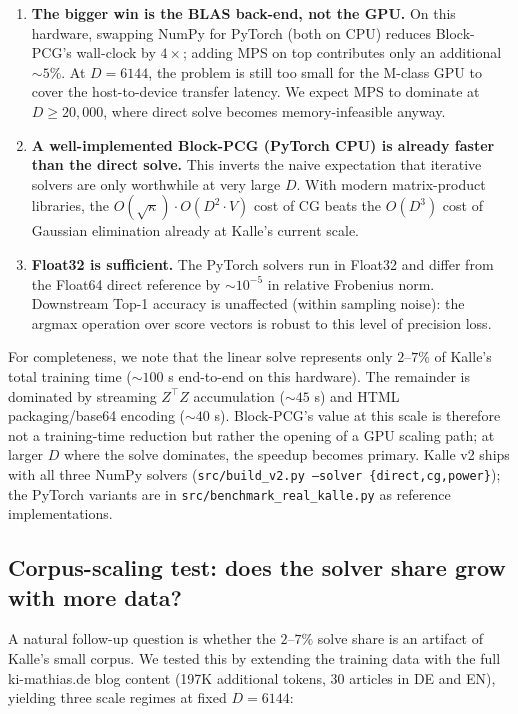 \documentclass[11pt,a4paper]{article}
\begin{document}
\begin{enumerate}
  \setlength\itemsep{0pt}
  \item \textbf{The bigger win is the BLAS back-end, not the GPU.} On this hardware, swapping NumPy for PyTorch (both on CPU) reduces Block-PCG's wall-clock by $4\times$; adding MPS on top contributes only an additional $\sim 5\%$. At $D = 6144$, the problem is still too small for the M-class GPU to cover the host-to-device transfer latency. We expect MPS to dominate at $D \geq 20{,}000$, where direct solve becomes memory-infeasible anyway.

  \item \textbf{A well-implemented Block-PCG (PyTorch CPU) is already faster than the direct solve.} This inverts the naive expectation that iterative solvers are only worthwhile at very large $D$. With modern matrix-product libraries, the $O(\sqrt{\kappa}) \cdot O(D^2 \cdot V)$ cost of CG beats the $O(D^3)$ cost of Gaussian elimination already at Kalle's current scale.

  \item \textbf{Float32 is sufficient.} The PyTorch solvers run in Float32 and differ from the Float64 direct reference by $\sim 10^{-5}$ in relative Frobenius norm. Downstream Top-1 accuracy is unaffected (within sampling noise): the argmax operation over score vectors is robust to this level of precision loss.
\end{enumerate}

For completeness, we note that the linear solve represents only $2$--$7\%$ of Kalle's total training time ($\sim 100$ s end-to-end on this hardware). The remainder is dominated by streaming $Z^\top Z$ accumulation ($\sim 45$ s) and HTML packaging/base64 encoding ($\sim 40$ s). Block-PCG's value at this scale is therefore not a training-time reduction but rather the opening of a GPU scaling path; at larger $D$ where the solve dominates, the speedup becomes primary. Kalle v2 ships with all three NumPy solvers (\texttt{src/build\_v2.py --solver \{direct,cg,power\}}); the PyTorch variants are in \texttt{src/benchmark\_real\_kalle.py} as reference implementations.

\subsection{Corpus-scaling test: does the solver share grow with more data?}

A natural follow-up question is whether the $2$--$7\%$ solve share is an artifact of Kalle's small corpus. We tested this by extending the training data with the full ki-mathias.de blog content (197K additional tokens, 30 articles in DE and EN), yielding three scale regimes at fixed $D = 6144$:
\end{document}
